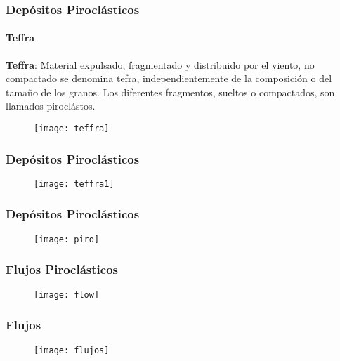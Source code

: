 \documentclass{beamer}
\begin{document}
\begin{frame}
\frametitle{Depósitos Piroclásticos}
\framesubtitle{Teffra}
\justifying
\textbf{Teffra}: Material expulsado, fragmentado y distribuido por el viento, no compactado se denomina tefra, independientemente de la composición o del tamaño de los granos. Los diferentes fragmentos, sueltos o compactados, son llamados piroclástos.
\begin{figure}
\begin{center}
\texttt{[image: teffra]}
\end{center}
\end{figure}
\end{frame}
\begin{frame}
\frametitle{Depósitos Piroclásticos}
\begin{figure}
\begin{center}
\texttt{[image: teffra1]}
\end{center}
\end{figure}
\end{frame}
\begin{frame}
\frametitle{Depósitos Piroclásticos}
\begin{figure}
\begin{center}
\texttt{[image: piro]}
\end{center}
\end{figure}
\end{frame}
\begin{frame}
\frametitle{Flujos Piroclásticos}
\begin{figure}
\begin{center}
\texttt{[image: flow]}
\end{center}
\end{figure}
\end{frame}
\begin{frame}
\frametitle{Flujos}
\begin{figure}
\begin{center}
\texttt{[image: flujos]}
\end{center}
\end{figure}
\end{frame}
\end{document}
